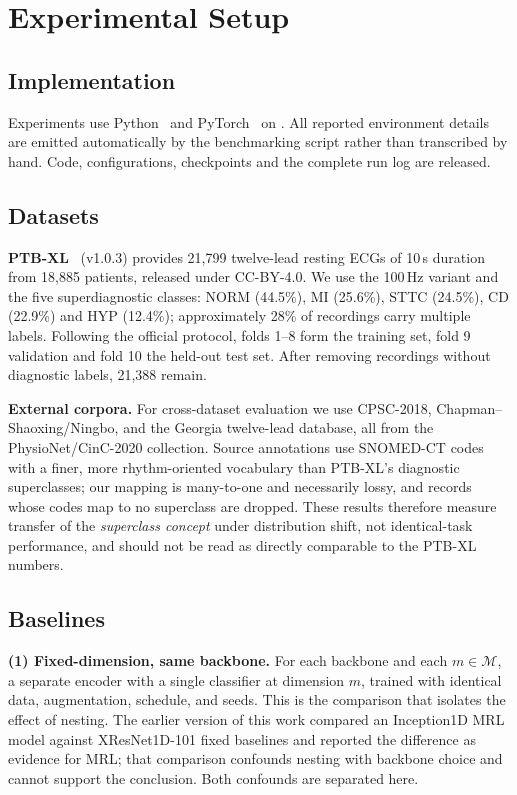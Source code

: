 \section{Experimental Setup}

\subsection{Implementation}

Experiments use Python~ and PyTorch~ on
. All reported environment details are emitted automatically by the
benchmarking script rather than transcribed by hand. Code, configurations,
checkpoints and the complete run log are released.

\subsection{Datasets}

\textbf{PTB-XL}~\cite{wagner2020,strodthoff2021} (v1.0.3) provides 21{,}799
twelve-lead resting ECGs of 10\,s duration from 18{,}885 patients, released
under CC-BY-4.0. We use the 100\,Hz variant and the five superdiagnostic
classes: NORM (44.5\%), MI (25.6\%), STTC (24.5\%), CD (22.9\%) and HYP
(12.4\%); approximately 28\% of recordings carry multiple labels. Following
the official protocol, folds 1--8 form the training set, fold 9 validation and
fold 10 the held-out test set. After removing recordings without diagnostic
labels, 21{,}388 remain.

\textbf{External corpora.} For cross-dataset evaluation we use CPSC-2018,
Chapman--Shaoxing/Ningbo, and the Georgia twelve-lead database, all from the
PhysioNet/CinC-2020 collection. Source annotations use SNOMED-CT codes with a
finer, more rhythm-oriented vocabulary than PTB-XL's diagnostic superclasses;
our mapping is many-to-one and necessarily lossy, and records whose codes map
to no superclass are dropped. These results therefore measure transfer of the
\emph{superclass concept} under distribution shift, not identical-task
performance, and should not be read as directly comparable to the PTB-XL
numbers.

\subsection{Baselines}

\textbf{(1) Fixed-dimension, same backbone.} For each backbone and each $m \in
\mathcal{M}$, a separate encoder with a single classifier at dimension $m$,
trained with identical data, augmentation, schedule, and seeds. This is the
comparison that isolates the effect of nesting. The earlier version of this
work compared an Inception1D MRL model against XResNet1D-101 fixed baselines
and reported the difference as evidence for MRL; that comparison confounds
nesting with backbone choice and cannot support the conclusion. Both
confounds are separated here.

